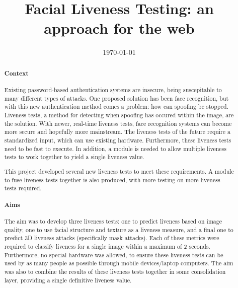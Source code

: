 \documentclass[12pt,a4paper]{article}
\title{Facial Liveness Testing: an approach for the web}
\author{} %
\date{\today}
\begin{document}
\maketitle
\begin{abstract}
\paragraph{Context}
    Existing password-based authentication systems are insecure, being suscepitable to many different types of attacks. One proposed solution has been face recognition, but with this new authentication method comes a problem:
    how can spoofing be stopped. Liveness tests, a method for detecting when spoofing has occured within the image, are the solution. With newer, real-time liveness tests, face recognition systems can become more secure and
    hopefully more mainstream. The liveness tests of the future require a standardized input, which can use existing hardware. Furthermore, these liveness tests need to be fast to execute. In addition, a module is needed to allow multiple liveness tests to work together to yield a single liveness value.

    This project developed several new liveness tests to meet these requirements. A module to fuse liveness tests together is also produced, with more testing on more liveness tests required.

\paragraph{Aims}
    The aim was to develop three liveness tests: one to predict liveness based on image quality, one to use facial structure and texture as a liveness measure,
    and a final one to predict 3D liveness attacks (specifically mask attacks). Each of these metrics were required to classify liveness for a single image within a maximum of 2 seconds.
    Furthermore, no special hardware was allowed, to ensure these liveness tests can be used by as many people as possible through mobile devices/laptop computers.
    The aim was also to combine the results of these liveness tests together in some consolidation layer, providing a single definitive liveness value.

\end{abstract}
\end{document}
